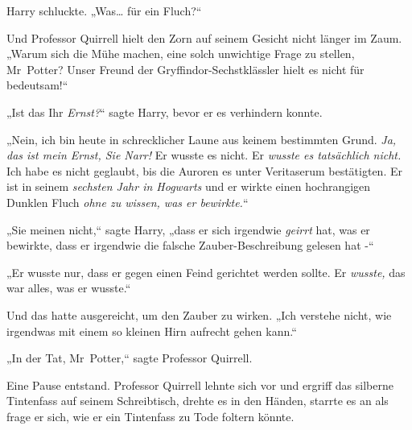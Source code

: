 Harry schluckte. „Was… für ein Fluch?“

Und Professor Quirrell hielt den Zorn auf seinem Gesicht nicht länger im Zaum. „Warum sich die Mühe machen, eine solch unwichtige Frage zu stellen, Mr~Potter? Unser Freund der Gryffindor-Sechstklässler hielt es nicht für bedeutsam!“

„Ist das Ihr \emph{Ernst?}“ sagte Harry, bevor er es verhindern konnte.

„Nein, ich bin heute in schrecklicher Laune aus keinem bestimmten Grund. \emph{Ja, das ist mein Ernst, Sie Narr!} Er wusste es nicht. Er \emph{wusste es tatsächlich nicht.} Ich habe es nicht geglaubt, bis die Auroren es unter Veritaserum bestätigten. Er ist in seinem \emph{sechsten Jahr in Hogwarts} und er wirkte einen hochrangigen Dunklen Fluch \emph{ohne zu wissen, was er bewirkte.}“

„Sie meinen nicht,“ sagte Harry, „dass er sich irgendwie \emph{geirrt} hat, was er bewirkte, dass er irgendwie die falsche Zauber-Beschreibung gelesen hat -“

„Er wusste nur, dass er gegen einen Feind gerichtet werden sollte. Er \emph{wusste,} das war alles, was er wusste.“

Und das hatte ausgereicht, um den Zauber zu wirken. „Ich verstehe nicht, wie irgendwas mit einem so kleinen Hirn aufrecht gehen kann.“

„In der Tat, Mr~Potter,“ sagte Professor Quirrell.

Eine Pause entstand. Professor Quirrell lehnte sich vor und ergriff das silberne Tintenfass auf seinem Schreibtisch, drehte es in den Händen, starrte es an als frage er sich, wie er ein Tintenfass zu Tode foltern könnte.

